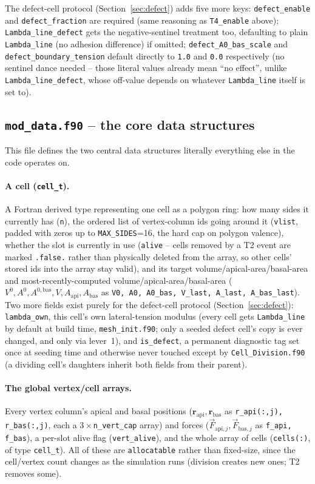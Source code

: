 \documentclass[11pt,a4paper]{report}
\newcommand{\rvec}{\mathbf{r}}
\newcommand{\fapi}[1]{\vec F_{\mathrm{api},#1}}
\newcommand{\fbas}[1]{\vec F_{\mathrm{bas},#1}}
\begin{document}
The defect-cell protocol (Section~\ref{sec:defect}) adds five more
keys: \texttt{defect\_enable} and \texttt{defect\_fraction} are
required (same reasoning as \texttt{T4\_enable} above);
\texttt{Lambda\_line\_defect} gets the negative-sentinel treatment too,
defaulting to plain \texttt{Lambda\_line} (no adhesion difference) if
omitted; \texttt{defect\_A0\_bas\_scale} and
\texttt{defect\_boundary\_tension} default directly to \texttt{1.0}
and \texttt{0.0} respectively (no sentinel dance needed -- those literal
values already mean ``no effect'', unlike \texttt{Lambda\_line\_defect},
whose off-value depends on whatever \texttt{Lambda\_line} itself is
set to).

\subsection{\texttt{mod\_data.f90} -- the core data structures}
\label{sec:mod-data-code}
This file defines the two central data structures literally everything
else in the code operates on.

\paragraph{A cell (\texttt{cell\_t}).} A Fortran derived type
representing one cell as a polygon ring: how many sides it currently
has (\texttt{n}), the ordered list of vertex-column ids going around it
(\texttt{vlist}, padded with zeros up to \texttt{MAX\_SIDES}=16, the
hard cap on polygon valence), whether the slot is currently in use
(\texttt{alive} -- cells removed by a T2 event are marked
\texttt{.false.} rather than physically deleted from the array, so
other cells' stored ids into the array stay valid), and its target
volume/apical-area/basal-area and most-recently-computed
volume/apical-area/basal-area
($V^0,A^0,A^{0,\mathrm{bas}},V,A_{\mathrm{api}},A_{\mathrm{bas}}$ as
\texttt{V0, A0, A0\_bas, V\_last, A\_last, A\_bas\_last}). Two more
fields exist purely for the defect-cell protocol
(Section~\ref{sec:defect}): \texttt{lambda\_own}, this cell's own
lateral-tension modulus (every cell gets \texttt{Lambda\_line} by
default at build time, \texttt{mesh\_init.f90}; only a seeded defect
cell's copy is ever changed, and only via lever~1), and
\texttt{is\_defect}, a permanent diagnostic tag set once at seeding
time and otherwise never touched except by \texttt{Cell\_Division.f90}
(a dividing cell's daughters inherit both fields from their parent).

\paragraph{The global vertex/cell arrays.} Every vertex column's apical
and basal positions ($\rvec_{\mathrm{api}}, \rvec_{\mathrm{bas}}$ as
\texttt{r\_api(:,j), r\_bas(:,j)}, each a $3\times$\texttt{n\_vert\_cap}
array) and forces ($\fapi{j},\fbas{j}$ as \texttt{f\_api, f\_bas}), a
per-slot alive flag (\texttt{vert\_alive}), and the whole array of
cells (\texttt{cells(:)}, of type \texttt{cell\_t}). All of these are
\texttt{allocatable} rather than fixed-size, since the cell/vertex
count changes as the simulation runs (division creates new ones; T2
removes some).
\end{document}
